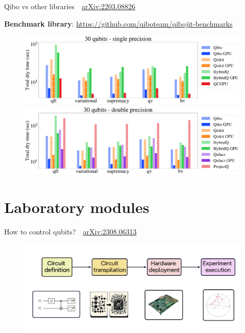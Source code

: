 \documentclass[aspectratio=169, 10pt, xcolor={svgnames}, hyperref={linkcolor=black}]{beamer}
\begin{document}
 \begin{frame}{Qibo vs other libraries \hfill \faBook\,\, \href{https://arxiv.org/abs/2203.08826}{arXiv:2203.08826}}

   {\small {\bf Benchmark library}: \url{https://github.com/qiboteam/qibojit-benchmarks} }

   \begin{figure}
     \includegraphics[scale=0.15]{figures/libraries_single_30qubits_total_dry_time.pdf}
     \includegraphics[scale=0.15]{figures/libraries_double_30qubits_total_dry_time.pdf}
   \end{figure}

 \end{frame}

\section{Laboratory modules}

\begin{frame}{How to control qubits?  \hfill \faBook\,\, \href{https://arxiv.org/abs/2308.06313}{arXiv:2308.06313}}
  \begin{figure}
    \includegraphics[width=\textwidth]{figures/algorithmdeployment.png}
  \end{figure}
\end{frame}
\end{document}
